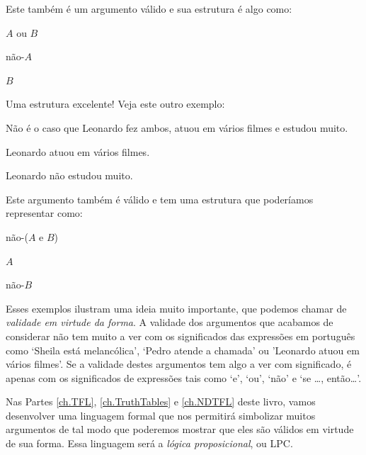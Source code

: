 Este também é um argumento válido e sua estrutura é algo como:
	\begin{earg}
		\item[] $A$ ou $B$
		\item[] não-$A$
		\item[\therefore] $B$
	\end{earg}
Uma estrutura excelente! Veja este outro exemplo:
	\begin{earg}
		\item[] Não é o caso que Leonardo fez ambos, atuou em vários filmes e estudou muito.
		\item[] Leonardo atuou em vários filmes.
		\item[\therefore] Leonardo não estudou muito.
	\end{earg}
Este argumento também é válido e tem uma estrutura que poderíamos representar como:
	\begin{earg}
		\item[] não-($A$ e $B$)
		\item[] $A$
		\item[\therefore] não-$B$
	\end{earg}
Esses exemplos ilustram uma ideia muito importante, que podemos chamar de \emph{validade em virtude da forma}.
A validade dos argumentos que acabamos de considerar não tem muito a ver com os significados das expressões em português como `Sheila está melancólica', `Pedro atende a chamada' ou 'Leonardo atuou em vários filmes'.
Se a validade destes argumentos tem algo a ver com significado, é apenas com os significados de expressões tais como `e', `ou', `não' e `se \ldots, então\ldots'.

Nas Partes \ref{ch.TFL}, \ref{ch.TruthTables} e \ref{ch.NDTFL} deste livro, vamos desenvolver uma linguagem formal que nos permitirá simbolizar muitos argumentos de tal modo que poderemos mostrar que eles são válidos em virtude de sua forma.
Essa linguagem será a \emph{lógica proposicional}, ou LPC.


